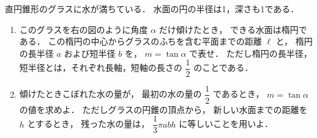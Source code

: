 \documentclass[../../main.tex]{subfiles}
\begin{document}
直円錐形のグラスに水が満ちている．
水面の円の半径は1，深さも1である．

\begin{figure}[H]
  \centering
\end{figure}

\begin{enumerate}
  \item このグラスを右の図のように角度 $\alpha$ だけ傾けたとき，
    できる水面は楕円である．
    この楕円の中心からグラスのふちを含む平面までの距離 $\ell$ と，
    楕円の長半径 $a$ および短半径 $b$ を，
    $m=\tan\alpha$ で表せ．
    ただし楕円の長半径，短半径とは，それぞれ長軸，短軸の長さの $\displaystyle\dfrac{1}{2}$ のことである．

  \item 傾けたときこぼれた水の量が，
    最初の水の量の $\displaystyle\dfrac{1}{2}$ であるとき，
    $m=\tan\alpha$ の値を求めよ．
    ただしグラスの円錐の頂点から，
    新しい水面までの距離を $h$ とするとき，
    残った水の量は，
    $\displaystyle\dfrac{1}{3}\pi abh$ に等しいことを用いよ．
\end{enumerate}
\end{document}
